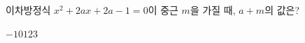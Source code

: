 이차방정식 $x^2+2ax+2a-1=0$이 중근 $m$을 가질 때, $a+m$의 값은? 
\begin{choices32}{$-1$}{$0$}{$1$}{$2$}{$3$}\end{choices32}
